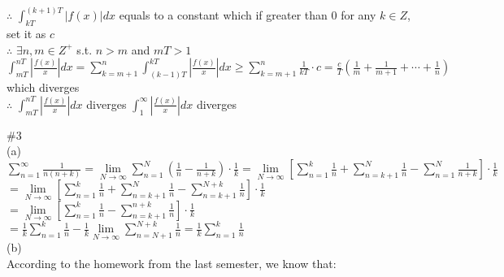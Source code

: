 \documentclass{article}
\begin{document}
$\therefore$ \qquad $\displaystyle \int_{kT}^{(k+1)T} \left|f(x)\right|dx$ equals to a constant which if greater than $0$ for any $k \in Z$, set it as $c$\\

$\therefore$ \qquad $\exists n, m  \in Z^+$ s.t. $n>m$ and $mT > 1$\\

\hskip 1cm $\displaystyle \int_{mT}^{nT} \left|\frac{f(x)}{x}\right|dx = \sum \limits_{k=m+1}^n \int_{(k-1)T}^{kT} \left|\frac{f(x)}{x}\right|dx \geq \sum \limits_{k=m+1}^n \frac{1}{kT} \cdot c = \frac{c}{T} \left(\frac{1}{m} + \frac{1}{m+1} + \cdots + \frac{1}{n}\right)$ which diverges\\

$\therefore$ \qquad $\displaystyle \int_{mT}^{nT} \left|\frac{f(x)}{x}\right|dx$ diverges \qquad $\displaystyle \int_1^\infty \left|\frac{f(x)}{x}\right|dx$ diverges\\

\vskip 6cm

\textcolor[rgb]{0.00,0.00,0.50}{\#3}\\

(a)\\

$\displaystyle \sum \limits_{n=1}^\infty \frac{1}{n(n+k)} = \lim \limits_{N \to \infty} \sum \limits_{n=1}^N \left(\frac{1}{n} - \frac{1}{n+k}\right) \cdot \frac{1}{k} = \lim \limits_{N \to \infty} \left[\sum \limits_{n=1}^k \frac{1}{n} + \sum \limits_{n=k+1}^N \frac{1}{n} - \sum \limits_{n=1}^N \frac{1}{n+k}\right] \cdot \frac{1}{k}$\\

\hskip 6.7cm $\displaystyle = \lim \limits_{N \to \infty} \left[\sum \limits_{n=1}^k \frac{1}{n} + \sum \limits_{n=k+1}^N \frac{1}{n} - \sum \limits_{n=k+1}^{N+k} \frac{1}{n}\right] \cdot \frac{1}{k}$\\

\hskip 6.7cm $\displaystyle = \lim \limits_{N \to \infty} \left[\sum \limits_{n=1}^k \frac{1}{n} - \sum \limits_{n=k+1}^{n+k} \frac{1}{n}\right] \cdot \frac{1}{k}$\\

\hskip 6.7cm $\displaystyle = \frac{1}{k} \sum \limits_{n=1}^k \frac{1}{n} - \frac{1}{k} \lim \limits_{N \to \infty} \sum \limits_{n=N+1}^{N+k} \frac{1}{n} = \frac{1}{k} \sum \limits_{n=1}^k \frac{1}{n}$\\

(b)\\

According to the homework from the last semester, we know that:\\
\end{document}
